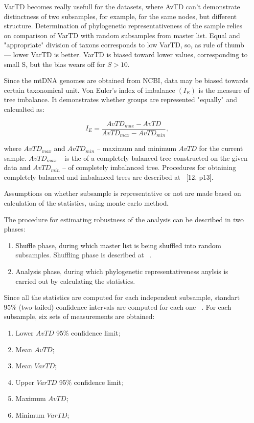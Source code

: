 \documentclass[a4paper,11pt]{article}
\begin{document}
VarTD becomes really usefull for the datasets, where AvTD can't demonstrate distinctness of two subsamples, for example, for the same nodes, but different structure. Determination of phylogenetic representativeness of the sample relies on comparison of VarTD with random subsamples from master list. Equal and "appropriate" division of taxons corresponds to low VarTD, so, as rule of thumb — lower VarTD is better. VarTD is biased toward lower values, corresponding to small S, but the bias wears off for $S>10$.

Since the mtDNA genomes are obtained from NCBI, data may be biased towards certain taxonomical unit. Von Euler's index of imbalance $(I_{E})$ is the measure of tree imbalance. It demonstrates whether groups are represented "equally" and calcualted as:

\begin{equation*}
I_{E}=\frac{AvTD_{max}-AvTD}{AvTD_{max}-AvTD_{min}},
\end{equation*}

where $AvTD_{max}$  and $AvTD_{min}$  -- maximum and minimum $AvTD$ for the current sample. $AvTD_{max}$ -- is the  of a completely balanced tree constructed on the given data and  $AvTD_{min}$ --  of completely imbalanced tree. Procedures for obtaining completely balanced and imbalanced trees are described at ~\cite{dowell2005molecular}[12, p13].

Assumptions on whether subsample is representative or not are made based on calculation of the statistics, using monte carlo method. 

The procedure for estimating robustness of the analysis can be described in two phases:
\begin{enumerate}
  \item Shuffle phase, during which master list is being shuffled into random subsamples. Shuffling phase is described at ~\cite{dowell2005molecular}.
  \item Analysis phase, during which phylogenetic representativeness anylsis is carried out by calculating the statistics.
\end{enumerate}

Since all the statistics are computed for each independent subsample, standart 95\% (two-tailed) confidence intervals are computed for each one ~\cite{dowell2005molecular}. For each subsample, six sets of measurements are obtained:

\begin{enumerate}
\item Lower $AvTD$ 95\% confidence limit;
\item Mean $AvTD$;
\item Mean $VarTD$;
\item Upper $VarTD$ 95\% confidence limit;
\item Maximum $AvTD$;
\item Minimum $VarTD$;
\end{enumerate}
\end{document}
